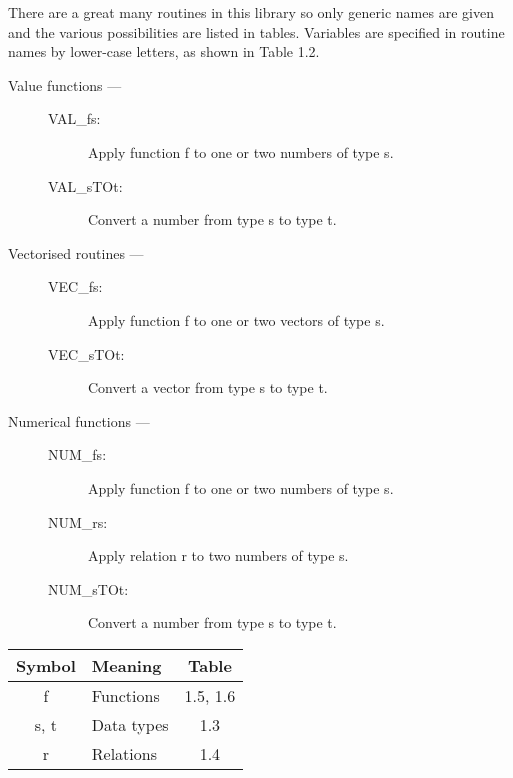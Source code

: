 There are a great many routines in this library so only generic names are given
and the various possibilities are listed in tables.
Variables are specified in routine names by lower-case letters, as shown in
Table 1.2.

\begin{description}

\item [Value functions ---]

\begin{description}
\item [VAL\_fs:]  Apply function f to one or two numbers of type s.
\item [VAL\_sTOt:]  Convert a number from type s to type t.
\end{description}

\item [Vectorised routines ---]

\begin{description}
\item [VEC\_fs:]  Apply function f to one or two vectors of type s.
\item [VEC\_sTOt:]  Convert a vector from type s to type t.
\end{description}

\item [Numerical functions ---]

\begin{description}
\item [NUM\_fs:]  Apply function f to one or two numbers of type s.
\item [NUM\_rs:]  Apply relation r to two numbers of type s.
\item [NUM\_sTOt:]  Convert a number from type s to type t.
\end{description}

\end{description}

\vspace*{5mm}

\begin{center}
\begin{tabular}{|c|l|c|}
\hline
{\bf Symbol } & {\bf Meaning } & { Table } \\
\hline
f    & Functions  & 1.5, 1.6 \\
s, t & Data types & 1.3      \\
r    & Relations  & 1.4      \\
\hline
\end{tabular}
\end{center}

